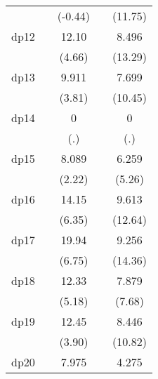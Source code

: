 {\begin{tabular}{l*{4}{c}}
            &                     &     (-0.44)         &                     &     (11.75)         \\
[1em]
dp12        &                     &       12.10\sym{***}&                     &       8.496\sym{***}\\
            &                     &      (4.66)         &                     &     (13.29)         \\
[1em]
dp13        &                     &       9.911\sym{***}&                     &       7.699\sym{***}\\
            &                     &      (3.81)         &                     &     (10.45)         \\
[1em]
dp14        &                     &           0         &                     &           0         \\
            &                     &         (.)         &                     &         (.)         \\
[1em]
dp15        &                     &       8.089\sym{*}  &                     &       6.259\sym{***}\\
            &                     &      (2.22)         &                     &      (5.26)         \\
[1em]
dp16        &                     &       14.15\sym{***}&                     &       9.613\sym{***}\\
            &                     &      (6.35)         &                     &     (12.64)         \\
[1em]
dp17        &                     &       19.94\sym{***}&                     &       9.256\sym{***}\\
            &                     &      (6.75)         &                     &     (14.36)         \\
[1em]
dp18        &                     &       12.33\sym{***}&                     &       7.879\sym{***}\\
            &                     &      (5.18)         &                     &      (7.68)         \\
[1em]
dp19        &                     &       12.45\sym{***}&                     &       8.446\sym{***}\\
            &                     &      (3.90)         &                     &     (10.82)         \\
[1em]
dp20        &                     &       7.975\sym{*}  &                     &       4.275\sym{***}\\

\end{tabular}}
